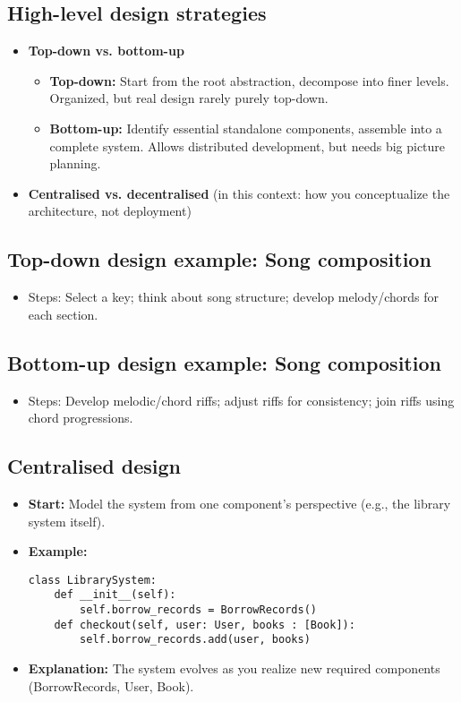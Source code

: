 \documentclass[11pt,a4paper]{article}
\begin{document}
\subsection*{High-level design strategies}
\begin{itemize}
    \item \textbf{Top-down vs. bottom-up}
        \begin{itemize}
            \item \textbf{Top-down:} Start from the root abstraction, decompose into finer levels. Organized, but real design rarely purely top-down.
            \item \textbf{Bottom-up:} Identify essential standalone components, assemble into a complete system. Allows distributed development, but needs big picture planning.
        \end{itemize}
    \item \textbf{Centralised vs. decentralised} (in this context: how you conceptualize the architecture, not deployment)
\end{itemize}

\subsection*{Top-down design example: Song composition}
\begin{itemize}
    \item Steps: Select a key; think about song structure; develop melody/chords for each section.
\end{itemize}

\subsection*{Bottom-up design example: Song composition}
\begin{itemize}
    \item Steps: Develop melodic/chord riffs; adjust riffs for consistency; join riffs using chord progressions.
\end{itemize}

\subsection*{Centralised design}
\begin{itemize}
    \item \textbf{Start:} Model the system from one component's perspective (e.g., the library system itself).
    \item \textbf{Example:} 
        \begin{verbatim}
class LibrarySystem:
    def __init__(self):
        self.borrow_records = BorrowRecords()
    def checkout(self, user: User, books : [Book]):
        self.borrow_records.add(user, books)
        \end{verbatim}
    \item \textbf{Explanation:} The system evolves as you realize new required components (BorrowRecords, User, Book).
\end{itemize}
\end{document}
